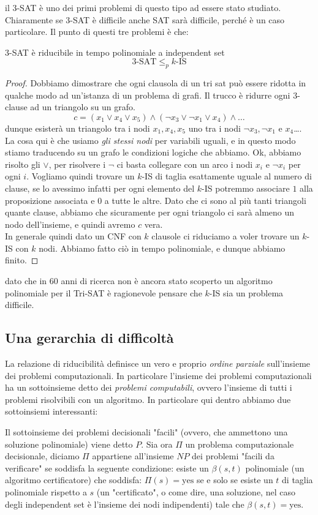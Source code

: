 \documentclass[11pt]{scrartcl}
\begin{document}
	il $3$-SAT è uno dei primi problemi di questo tipo ad essere stato studiato. Chiaramente se $3$-SAT è difficile anche SAT sarà difficile, perché è un caso particolare. Il punto di questi tre problemi è che:
	\begin{lemma}[Il $k$-IS è difficile]
		$3$-SAT è riducibile in tempo polinomiale a independent set
		$$\text{$3$-SAT}\le_p \text{$k$-IS}$$
	\end{lemma}
	\begin{proof}
		Dobbiamo dimostrare che ogni clausola di un tri sat può essere ridotta in qualche modo ad un'istanza di un problema di grafi. Il trucco è ridurre ogni $3$-clause ad un triangolo su un grafo. 
		$$c=(x_1\lor x_4 \lor x_5)\land (\lnot x_3 \lor \lnot x_1 \lor x_4)\land \dots $$
		dunque esisterà un triangolo tra i nodi $x_1,x_4,x_5$ uno tra i nodi $\lnot x_3, \lnot x_1 $ e $x_4$\dots. La cosa qui è che usiamo \textit{gli stessi nodi} per variabili uguali, e in questo modo stiamo traducendo su un grafo le condizioni logiche che abbiamo. Ok, abbiamo risolto gli $\lor$, per risolvere i $\lnot$ ci basta collegare con un arco i nodi $x_i$ e $\lnot x_i$ per ogni $i$. Vogliamo quindi trovare un $k$-IS di taglia esattamente 
		uguale al numero di clause, se lo avessimo infatti per ogni elemento del $k$-IS potremmo associare $1$ alla proposizione associata e $0$ a tutte le altre. Dato che ci sono al più tanti triangoli quante clause, abbiamo che sicuramente per ogni triangolo ci sarà almeno un nodo dell'insieme, e quindi avremo $c$ vera. \\
		In generale quindi dato un CNF con $k$ clausole ci riduciamo a voler trovare un $k$-IS con $k$ nodi. Abbiamo fatto ciò in tempo polinomiale, e dunque abbiamo finito.
	\end{proof}
	dato che in $60$ anni di ricerca non è ancora stato scoperto un algoritmo polinomiale per il Tri-SAT è ragionevole pensare che $k$-IS sia un problema difficile. 
	
	\subsection{Una gerarchia di difficoltà}
	
	La relazione di riducibilità definisce un vero e proprio \textit{ordine parziale} sull'insieme dei problemi computazionali. In particolare l'insieme dei problemi computazionali ha un sottoinsieme detto dei \textit{problemi computabili}, ovvero l'insieme di tutti i problemi risolvibili con un algoritmo. In particolare qui dentro abbiamo due sottoinsiemi interessanti:
	\begin{definition}[$P$ vs $NP$]
		Il sottoinsieme dei problemi decisionali "facili" (ovvero, che ammettono una soluzione polinomiale) viene detto $P$. Sia ora $\Pi$ un problema computazionale decisionale, diciamo $\Pi$ appartiene all'insieme $NP$ dei problemi "facili da verificare" se soddisfa la seguente condizione: 
		esiste un $\beta(s,t)$ polinomiale (un algoritmo certificatore) che soddisfa: $\Pi(s)=\text{yes}$ se e solo se esiste un $t$ di taglia polinomiale rispetto a $s$ (un "certificato", o come dire, una soluzione, nel caso degli independent set è l'insieme dei nodi indipendenti) tale che $\beta(s,t)=\text{yes}$.
	\end{definition}
	
\end{document}
